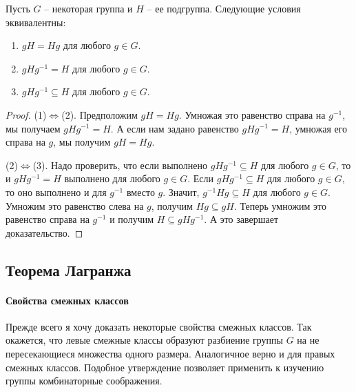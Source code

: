\begin{claim}
\label{claim::normal_crit}
Пусть $G$ -- некоторая группа и $H$ -- ее подгруппа.
Следующие условия эквивалентны:
\begin{enumerate}
\item $gH = Hg$ для любого $g\in G$.

\item $gHg^{-1} = H$ для любого $g\in G$.

\item $gHg^{-1}\subseteq H$ для любого $g\in G$.
\end{enumerate}
\end{claim}
\begin{proof}
(1)$\Leftrightarrow$(2).
Предположим $gH = Hg$.
Умножая это равенство справа на $g^{-1}$, мы получаем $gH g^{-1} = H$.
А если нам задано равенство $g H g^{-1} = H$, умножая его справа на $g$, мы получим $gH = Hg$.

(2)$\Leftrightarrow$(3).
Надо проверить, что если выполнено $gHg^{-1}\subseteq H$ для любого $g\in G$, то и $gHg^{-1} = H$ выполнено для любого $g\in G$.
Если  $gHg^{-1}\subseteq H$ для любого $g\in G$, то оно выполнено и для $g^{-1}$ вместо $g$.
Значит, $g^{-1}Hg \subseteq H$ для любого $g\in G$.
Умножим это равенство слева на $g$, получим $Hg \subseteq gH$.
Теперь умножим это равенство справа на $g^{-1}$ и получим $H \subseteq gH g^{-1}$.
А это завершает доказательство.
\end{proof}

\subsection{Теорема Лагранжа}

\paragraph{Свойства смежных классов}

Прежде всего я хочу доказать некоторые свойства смежных классов.
Так окажется, что левые смежные классы образуют разбиение группы $G$ на не пересекающиеся множества одного размера.
Аналогичное верно и для правых смежных классов.
Подобное утверждение позволяет применить к изучению группы комбинаторные соображения.


